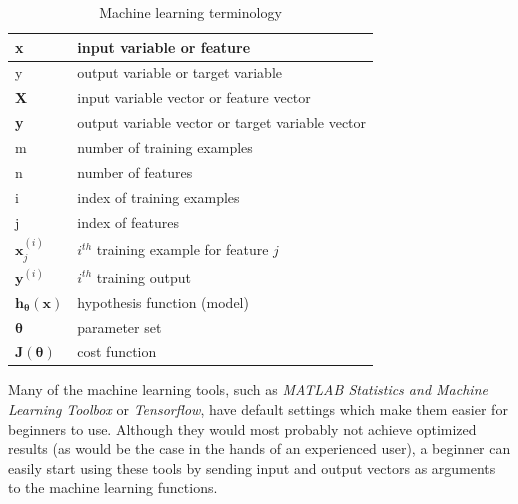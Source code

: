 \begin{table}
\caption{Machine learning terminology}
\label{arm:machineLearningTerminology}
\begin{center}
\begin{tabular}{||l|l||}\hline
x & input variable or feature \\\hline
y & output variable or target variable \\\hline
\textbf{X} & input variable vector or feature vector \\\hline
\textbf{y} & output variable vector or target variable vector \\\hline
m & number of training examples \\\hline
n & number of features \\\hline
i & index of training examples \\\hline
j & index of features \\\hline
$\textbf{x}_j^{(i)}$ & $i^{th}$ training example for feature $j$ \\\hline
$\textbf{y}^{(i)}$ & $i^{th}$ training output  \\\hline
$\textbf{h}_{\bm{\theta}}(\textbf{x})$ &hypothesis function (model)\\\hline
$\bm{\theta}$ &parameter set\\\hline
$\textbf{J}({\bm{\theta}})$ &cost function  \\\hline

\end{tabular}
\end{center}
\end{table}

Many of the machine learning tools, such as \emph{MATLAB Statistics and Machine Learning Toolbox} or \emph{Tensorflow}, have default settings which make them easier for beginners to use. 
Although they would most probably not achieve optimized results (as would be the case in the hands of an experienced user), a beginner can easily start using these tools by sending input and output vectors as arguments to the machine learning functions. 

